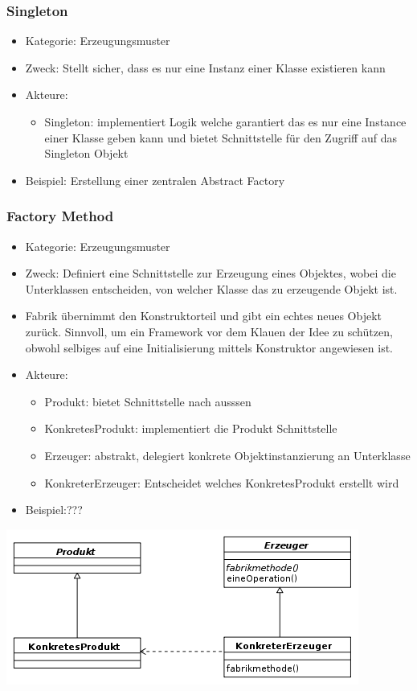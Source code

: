 \documentclass[11pt, fleqn, a4paper, leqno]{scrartcl} %
\begin{document}
		\subsubsection{Singleton}
			\begin{itemize}
				\item Kategorie: Erzeugungsmuster
				\item Zweck: Stellt sicher, dass es nur eine Instanz einer Klasse existieren kann
				\item Akteure: 
					\begin{itemize}
						\item Singleton: implementiert Logik welche garantiert das es nur eine Instance einer Klasse geben kann und bietet Schnittstelle für den Zugriff auf das Singleton Objekt
					\end{itemize}
				\item Beispiel: Erstellung einer zentralen Abstract Factory
			\end{itemize}
		\newpage
		\subsubsection{Factory Method}
			\begin{itemize}
				\item Kategorie: Erzeugungsmuster
				\item Zweck: Definiert eine Schnittstelle zur Erzeugung eines Objektes, wobei die Unterklassen entscheiden, von welcher Klasse das zu erzeugende Objekt ist.
				\item Fabrik übernimmt den Konstruktorteil und gibt ein echtes neues Objekt zurück. Sinnvoll, um ein Framework vor dem Klauen der Idee zu schützen, obwohl selbiges auf eine Initialisierung mittels Konstruktor angewiesen ist.
				\item Akteure: 
					\begin{itemize}
						\item Produkt: bietet Schnittstelle nach ausssen
						\item KonkretesProdukt: implementiert die Produkt Schnittstelle
						\item Erzeuger: abstrakt, delegiert konkrete Objektinstanzierung an  Unterklasse
						\item KonkreterErzeuger: Entscheidet welches KonkretesProdukt erstellt wird
					\end{itemize}
				\item Beispiel:???
			\end{itemize}
			\includegraphics{images/factory-method.png}
		\newpage
		
\end{document}

